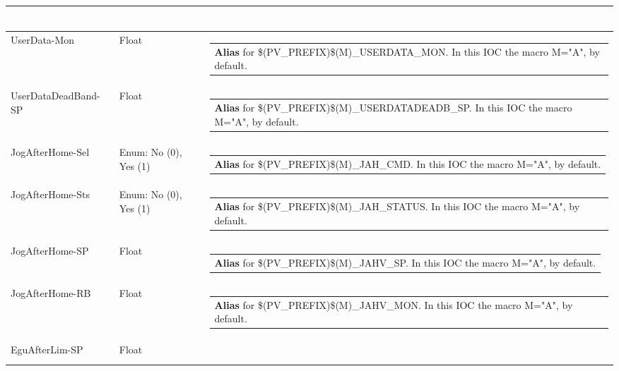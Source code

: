 \documentclass[openany]{article}
\begin{document}
\begin{longtable}{| m{4.5cm} m{2.5cm}  m{8.5cm} |}
\begin{tabular}{@{}m{6cm}@{}}
            \end{tabular} \hypertarget{pv:user-data-mon}{}\\ \hline
        UserData-Mon & Float & \begin{tabular}{@{}m{6cm}@{}}
                \textbf{\color{blue} Alias} for \$(PV\_PREFIX)\$(M)\_USERDATA\_MON. In this IOC the macro M="A", by default.
            \end{tabular} \hypertarget{pv:user-data-deadband}{}\\ \hline
        UserDataDeadBand-SP & Float & \begin{tabular}{@{}m{6cm}@{}}
                \textbf{\color{blue} Alias} for \$(PV\_PREFIX)\$(M)\_USERDATADEADB\_SP. In this IOC the macro M="A", by default.
            \end{tabular} \hypertarget{pv:jog-after-home-sel}{}\\ \hline
        JogAfterHome-Sel & Enum: No (0), Yes (1) & \begin{tabular}{@{}m{6cm}@{}}
                \textbf{\color{blue} Alias} for \$(PV\_PREFIX)\$(M)\_JAH\_CMD. In this IOC the macro M="A", by default.
            \end{tabular} \hypertarget{}{}\\ \hline
        JogAfterHome-Sts & Enum: No (0), Yes (1) & \begin{tabular}{@{}m{6cm}@{}}
                \textbf{\color{blue} Alias} for \$(PV\_PREFIX)\$(M)\_JAH\_STATUS. In this IOC the macro M="A", by default.
            \end{tabular} \hypertarget{pv:jog-after-home-sp}{}\\ \hline
        JogAfterHome-SP & Float & \begin{tabular}{@{}m{6cm}@{}}
                \textbf{\color{blue} Alias} for \$(PV\_PREFIX)\$(M)\_JAHV\_SP. In this IOC the macro M="A", by default.
            \end{tabular} \hypertarget{}{}\\ \hline
        JogAfterHome-RB & Float & \begin{tabular}{@{}m{6cm}@{}}
                \textbf{\color{blue} Alias} for \$(PV\_PREFIX)\$(M)\_JAHV\_MON. In this IOC the macro M="A", by default.
            \end{tabular} \hypertarget{pv:egu-after-lim}{}\\ \hline
        EguAfterLim-SP & Float & \begin{tabular}{@{}m{6cm}@{}}

\end{tabular}
\end{longtable}
\end{document}
